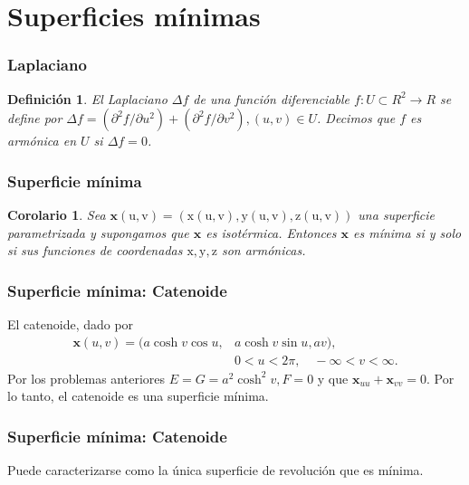 \documentclass[10pt]{beamer}
\newtheorem{definicion}{Definición}
\newtheorem{corolario}{Corolario}[teorema]
\begin{document}
  
 \section{Superficies mínimas}


 \begin{frame}
  \frametitle{Laplaciano}
  \begin{cajita}
    \begin{definicion}
      El Laplaciano \(\Delta f\) de una función diferenciable \(f: U \subset R^2 \rightarrow R\) se define por \(\Delta f=\left(\partial^2 f / \partial u^2\right)+\left(\partial^2 f / \partial v^2\right),(u, v) \in U\). Decimos que \(f\) es armónica en \(U\) si \(\Delta f=0\).
    \end{definicion}
  \end{cajita}

  \end{frame}

  \begin{frame}
    \frametitle{Superficie mínima}

    \begin{cajita}
      \begin{corolario}
        Sea \(\mathbf{x}(\mathrm{u}, \mathrm{v})=(\mathrm{x}(\mathrm{u}, \mathrm{v}), \mathrm{y}(\mathrm{u}, \mathrm{v}), \mathrm{z}(\mathrm{u}, \mathrm{v}))\) una superficie parametrizada y supongamos que \(\mathbf{x}\) es isotérmica. Entonces \(\mathbf{x}\) es mínima si y solo si sus funciones de coordenadas \(\mathrm{x}, \mathrm{y}, \mathrm{z}\) son armónicas.
      \end{corolario}
    \end{cajita}
    \end{frame}
    
  
  \begin{frame}
    \frametitle{Superficie mínima: Catenoide}

      El catenoide, dado por
  $$
  \begin{aligned}
  \mathbf{x}(u, v)=(a \cosh v \cos u, & a \cosh v \sin u, a v), \\
  & 0<u<2 \pi, \quad-\infty<v<\infty .
  \end{aligned}
  $$
  Por los problemas anteriores \(E=G=a^2 \cosh ^2 v, F=0\) y que \(\mathbf{x}_{u u}+\mathbf{x}_{v v}=0\). Por lo tanto, el catenoide es una superficie mínima.
  \end{frame}
  
  \begin{frame}
    \frametitle{Superficie mínima: Catenoide}

    Puede caracterizarse como la única superficie de revolución que es mínima.
  \end{frame}
  
\end{document}
